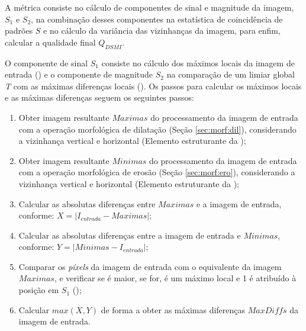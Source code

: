 
\par A métrica consiste no cálculo de componentes de sinal e magnitude da imagem, $S_{1}$ e $S_{2}$, na combinação desses componentes na estatística de coincidência de padrões $S$ e no cálculo da variância das vizinhanças da imagem, para enfim, calcular a qualidade final $Q_{DSMI}$.

\par O componente de sinal $S_{1}$ consiste no cálculo dos máximos locais da imagem de entrada () e o componente de magnitude $S_{2}$ na comparação de um limiar global \textit{T} com as máximas diferenças locais (). Os passos para calcular os máximos locais e as máximas diferenças seguem os seguintes passos:

\begin{enumerate}
    \item Obter imagem resultante $Maximas$ do processamento da imagem de entrada com a operação morfológica de dilatação (Seção \ref{sec:morf:dil}), considerando a vizinhança vertical e horizontal (Elemento estruturante da );
    \item Obter imagem resultante $Minimas$ do processamento da imagem de entrada com a operação morfológica de erosão (Seção \ref{sec:morf:ero}), considerando a vizinhança vertical e horizontal (Elemento estruturante da );
    \item Calcular as absolutas diferenças entre $Maximas$ e a imagem de entrada, conforme: $X = |I_{entrada} - Maximas|$;
    \item Calcular as absolutas diferenças entre a imagem de entrada e $Minimas$, conforme: $Y = |Minimas - I_{entrada}|$;
    \item Comparar os \textit{píxels} da imagem de entrada com o equivalente da imagem $Maximas$, e verificar se é maior, se for, é um máximo local e 1 é atribuído à posição em $S_{1}$ ();
    \item Calcular $max(X, Y)$ de forma a obter as máximas diferenças $MaxDiffs$ da imagem de entrada.
\end{enumerate}

